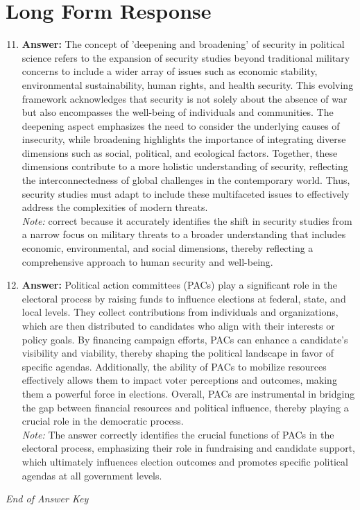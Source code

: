 \documentclass[12pt]{article}
\begin{document}
\section*{Long Form Response}
\begin{enumerate}[label=\arabic*.]
\setcounter{enumi}{10}
\item \textbf{Answer:} The concept of 'deepening and broadening' of security in political science refers to the expansion of security studies beyond traditional military concerns to include a wider array of issues such as economic stability, environmental sustainability, human rights, and health security. This evolving framework acknowledges that security is not solely about the absence of war but also encompasses the well-being of individuals and communities. The deepening aspect emphasizes the need to consider the underlying causes of insecurity, while broadening highlights the importance of integrating diverse dimensions such as social, political, and ecological factors. Together, these dimensions contribute to a more holistic understanding of security, reflecting the interconnectedness of global challenges in the contemporary world. Thus, security studies must adapt to include these multifaceted issues to effectively address the complexities of modern threats.
\\ \textit{Note:} correct because it accurately identifies the shift in security studies from a narrow focus on military threats to a broader understanding that includes economic, environmental, and social dimensions, thereby reflecting a comprehensive approach to human security and well-being.
\item \textbf{Answer:} Political action committees (PACs) play a significant role in the electoral process by raising funds to influence elections at federal, state, and local levels. They collect contributions from individuals and organizations, which are then distributed to candidates who align with their interests or policy goals. By financing campaign efforts, PACs can enhance a candidate's visibility and viability, thereby shaping the political landscape in favor of specific agendas. Additionally, the ability of PACs to mobilize resources effectively allows them to impact voter perceptions and outcomes, making them a powerful force in elections. Overall, PACs are instrumental in bridging the gap between financial resources and political influence, thereby playing a crucial role in the democratic process.
\\ \textit{Note:} The answer correctly identifies the crucial functions of PACs in the electoral process, emphasizing their role in fundraising and candidate support, which ultimately influences election outcomes and promotes specific political agendas at all government levels.
\end{enumerate}

\vfill
\noindent\textit{End of Answer Key}
\end{document}
